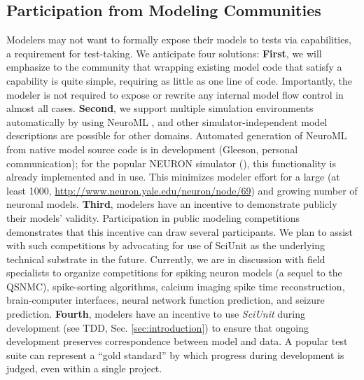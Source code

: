 \documentclass{frontiersSCNS}
\begin{document}
\subsection{Participation from Modeling Communities}
Modelers may not want to formally expose their models to tests via capabilities, a requirement for test-taking.  
We anticipate four solutions: \textbf{First}, we will emphasize to the community that wrapping existing model code that satisfy a capability is quite simple, requiring as little as one line of code. 
Importantly, the modeler is not required to expose or rewrite any internal model flow control in almost all cases. 
\textbf{Second}, we support multiple simulation environments automatically by using NeuroML \citep{gleeson_neuroml:_2010}, and other simulator-independent model descriptions are possible for other domains. 
Automated generation of NeuroML from native model source code is in development (Gleeson, personal communication); for the popular NEURON simulator (\cite{carnevale_neuron_2006}), this functionality is already implemented and in use. 
This minimizes modeler effort for a large (at least 1000, \url{http://www.neuron.yale.edu/neuron/node/69}) and growing number of neuronal models. 
\textbf{Third}, modelers have an incentive to demonstrate publicly their models' validity. 
Participation in public modeling competitions demonstrates that this incentive can draw several participants. We plan to assist with such competitions by advocating for use of SciUnit as the underlying technical substrate in the future. 
Currently, we are in discussion with field specialists to organize competitions for spiking neuron models (a sequel to the QSNMC), spike-sorting algorithms, calcium imaging spike time reconstruction, brain-computer interfaces, neural network function prediction, and seizure prediction.  
\textbf{Fourth}, modelers have an incentive to use \textit{SciUnit} during development (see TDD, Sec. \ref{sec:introduction}) to ensure that ongoing development preserves correspondence between model and data. 
A popular test suite can represent a ``gold standard'' by which progress during development is judged, even within a single project.
\end{document}
